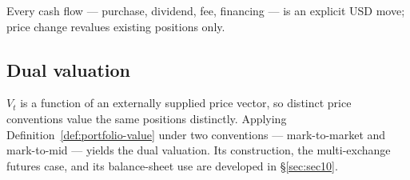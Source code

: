 \noindent Every cash flow --- purchase, dividend, fee, financing --- is an explicit USD move; price change revalues existing positions only.

\subsection{Dual valuation}

$V_t$ is a function of an externally supplied price vector, so distinct price conventions value the same positions distinctly. Applying Definition~\ref{def:portfolio-value} under two conventions --- mark-to-market and mark-to-mid --- yields the dual valuation. Its construction, the multi-exchange futures case, and its balance-sheet use are developed in \S\ref{sec:sec10}.
